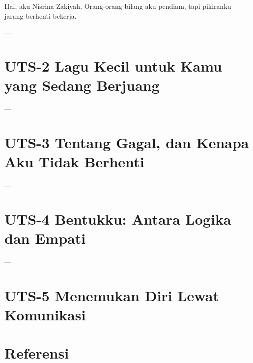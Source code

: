 Hai, aku Nisrina Zakiyah. Orang-orang bilang aku pendiam, tapi pikiranku jarang berhenti bekerja.

---

\chapter{UTS-2 Lagu Kecil untuk Kamu yang Sedang Berjuang}\label{uts-2}

---

\chapter{UTS-3 Tentang Gagal, dan Kenapa Aku Tidak Berhenti}\label{uts-3}

---

\chapter{UTS-4 Bentukku: Antara Logika dan Empati}\label{uts-4}

---

\chapter{UTS-5 Menemukan Diri Lewat Komunikasi}\label{uts-5}


\chapter*{Referensi}\label{referensi}

\label{refs}


